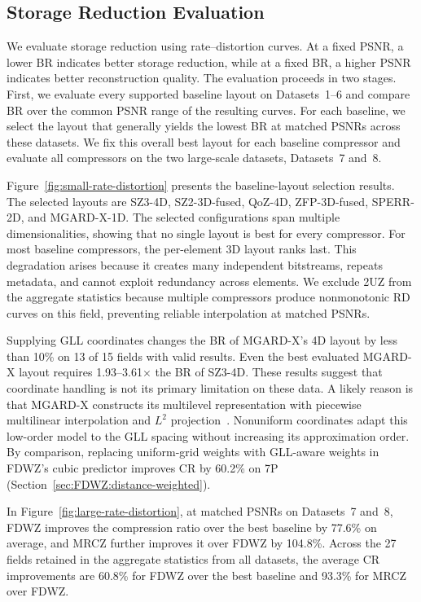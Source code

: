 \subsection{Storage Reduction Evaluation}

We evaluate storage reduction using rate--distortion curves. At a fixed PSNR, a lower BR indicates better storage reduction, while at a fixed BR, a higher PSNR indicates better reconstruction quality. The evaluation proceeds in two stages. First, we evaluate every supported baseline layout on Datasets~1--6 and compare BR over the common PSNR range of the resulting curves. For each baseline, we select the layout that generally yields the lowest BR at matched PSNRs across these datasets. We fix this overall best layout for each baseline compressor and evaluate all compressors on the two large-scale datasets, Datasets~7 and~8.

Figure~\ref{fig:small-rate-distortion} presents the baseline-layout selection results. The selected layouts are SZ3-4D, SZ2-3D-fused, QoZ-4D, ZFP-3D-fused, SPERR-2D, and MGARD-X-1D. The selected configurations span multiple dimensionalities, showing that no single layout is best for every compressor. For most baseline compressors, the per-element 3D layout ranks last. This degradation arises because it creates many independent bitstreams, repeats metadata, and cannot exploit redundancy across elements. We exclude 2UZ from the aggregate statistics because multiple compressors produce nonmonotonic RD curves on this field, preventing reliable interpolation at matched PSNRs.

Supplying GLL coordinates changes the BR of MGARD-X's 4D layout by less than 10\% on 13 of 15 fields with valid results. Even the best evaluated MGARD-X layout requires 1.93--3.61$\times$ the BR of SZ3-4D. These results suggest that coordinate handling is not its primary limitation on these data. A likely reason is that MGARD-X constructs its multilevel representation with piecewise multilinear interpolation and $L^2$ projection~\cite{gong2023mgard}. Nonuniform coordinates adapt this low-order model to the GLL spacing without increasing its approximation order. By comparison, replacing uniform-grid weights with GLL-aware weights in FDWZ's cubic predictor improves CR by 60.2\% on 7P (Section~\ref{sec:FDWZ:distance-weighted}).

In Figure~\ref{fig:large-rate-distortion}, at matched PSNRs on Datasets~7 and~8, FDWZ improves the compression ratio over the best baseline by 77.6\% on average, and MRCZ further improves it over FDWZ by 104.8\%. Across the 27 fields retained in the aggregate statistics from all datasets, the average CR improvements are 60.8\% for FDWZ over the best baseline and 93.3\% for MRCZ over FDWZ.


